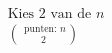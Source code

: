 \documentclass[preview]{standalone}
\begin{document}
\begin{align*}
\text{Kies }2\text{ van de }n\\\text{ punten: }n\choose 2
\end{align*}
\end{document}
